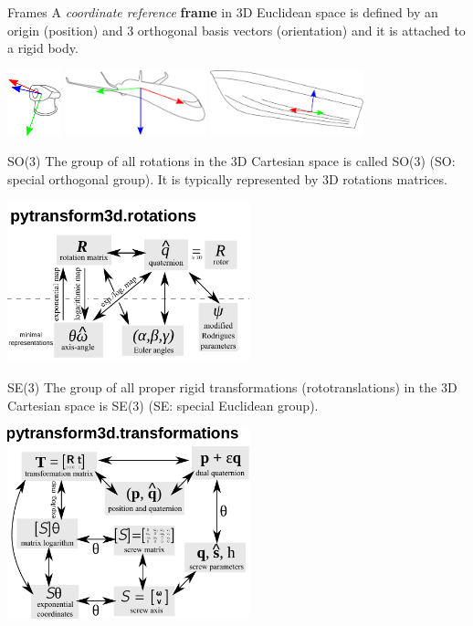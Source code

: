 \documentclass[14pt]{beamer}
\begin{document}
\begin{frame}{Frames}
A \textit{coordinate reference} \textbf{frame} in 3D Euclidean space is defined by an origin (position) and 3 orthogonal basis vectors (orientation) and it is attached to a rigid body.

\vskip 1cm

\includegraphics[height=1.9cm]{images/conventions_camera}
\includegraphics[height=1.9cm]{images/conventions_plane}
\includegraphics[height=1.9cm]{images/conventions_ship}
\end{frame}

\begin{frame}{SO(3)}
The group of all rotations in the 3D Cartesian space is called SO(3) (SO: special orthogonal group). It is typically represented by 3D rotations matrices.

\vfill

\includegraphics[width=7cm]{images/rotations}
\end{frame}

\begin{frame}{SE(3)}
The group of all proper rigid transformations (rototranslations) in the 3D Cartesian space is SE(3) (SE: special Euclidean group).

\vfill

\includegraphics[width=7cm]{images/transformations}
\end{frame}
\end{document}
